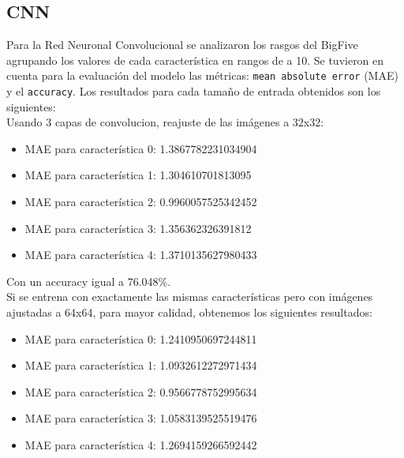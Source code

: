 \documentclass[10pt, a4paper]{article}
\begin{document}
            \subsection{CNN} 
                Para la Red Neuronal Convolucional se analizaron los rasgos del BigFive agrupando los valores de cada caracter\'istica en rangos de a 10. 
                Se tuvieron en cuenta para la evaluaci\'on del modelo las m\'etricas: \texttt{mean absolute error} (MAE) y el \texttt{accuracy}.
                Los resultados para cada tama\~no de entrada obtenidos son los siguientes: \\

                Usando 3 capas de convolucion, reajuste de las im\'agenes a 32x32:\\
                \begin{itemize}
                    \item[] MAE para caracter\'istica 0: 1.3867782231034904 
                    \item[] MAE para caracter\'istica 1: 1.304610701813095 
                    \item[] MAE para caracter\'istica 2: 0.9960057525342452
                    \item[] MAE para caracter\'istica 3: 1.356362326391812
                    \item[] MAE para caracter\'istica 4: 1.3710135627980433
                \end{itemize}
                
                Con un accuracy igual a 76.048\%.\\

                Si se entrena con exactamente las mismas caracter\'isticas pero con im\'agenes ajustadas a 64x64, para mayor calidad, obtenemos los siguientes resultados:
                \begin{itemize}
                    \item[] MAE para caracter\'istica 0: 1.2410950697244811
                    \item[] MAE para caracter\'istica 1: 1.0932612272971434
                    \item[] MAE para caracter\'istica 2: 0.9566778752995634
                    \item[] MAE para caracter\'istica 3: 1.0583139525519476
                    \item[] MAE para caracter\'istica 4: 1.2694159266592442
                \end{itemize}
                
\end{document}
